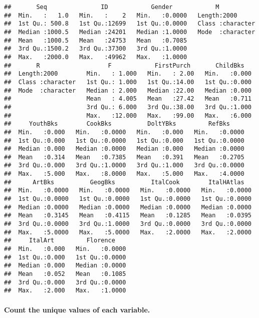 \documentclass[
]{article}
\begin{document}
\begin{verbatim}
##       Seq               ID            Gender            M            
##  Min.   :   1.0   Min.   :    2   Min.   :0.0000   Length:2000       
##  1st Qu.: 500.8   1st Qu.:12699   1st Qu.:0.0000   Class :character  
##  Median :1000.5   Median :24201   Median :1.0000   Mode  :character  
##  Mean   :1000.5   Mean   :24753   Mean   :0.7085                     
##  3rd Qu.:1500.2   3rd Qu.:37300   3rd Qu.:1.0000                     
##  Max.   :2000.0   Max.   :49962   Max.   :1.0000                     
##       R                   F            FirstPurch       ChildBks    
##  Length:2000        Min.   : 1.000   Min.   : 2.00   Min.   :0.000  
##  Class :character   1st Qu.: 1.000   1st Qu.:14.00   1st Qu.:0.000  
##  Mode  :character   Median : 2.000   Median :22.00   Median :0.000  
##                     Mean   : 4.005   Mean   :27.42   Mean   :0.711  
##                     3rd Qu.: 6.000   3rd Qu.:38.00   3rd Qu.:1.000  
##                     Max.   :12.000   Max.   :99.00   Max.   :6.000  
##     YouthBks        CookBks          DoltYBks         RefBks      
##  Min.   :0.000   Min.   :0.0000   Min.   :0.000   Min.   :0.0000  
##  1st Qu.:0.000   1st Qu.:0.0000   1st Qu.:0.000   1st Qu.:0.0000  
##  Median :0.000   Median :0.0000   Median :0.000   Median :0.0000  
##  Mean   :0.314   Mean   :0.7385   Mean   :0.391   Mean   :0.2705  
##  3rd Qu.:0.000   3rd Qu.:1.0000   3rd Qu.:1.000   3rd Qu.:0.0000  
##  Max.   :5.000   Max.   :8.0000   Max.   :5.000   Max.   :4.0000  
##      ArtBks          GeogBks          ItalCook        ItalHAtlas    
##  Min.   :0.0000   Min.   :0.0000   Min.   :0.0000   Min.   :0.0000  
##  1st Qu.:0.0000   1st Qu.:0.0000   1st Qu.:0.0000   1st Qu.:0.0000  
##  Median :0.0000   Median :0.0000   Median :0.0000   Median :0.0000  
##  Mean   :0.3145   Mean   :0.4115   Mean   :0.1285   Mean   :0.0395  
##  3rd Qu.:0.0000   3rd Qu.:1.0000   3rd Qu.:0.0000   3rd Qu.:0.0000  
##  Max.   :5.0000   Max.   :5.0000   Max.   :2.0000   Max.   :2.0000  
##     ItalArt         Florence     
##  Min.   :0.000   Min.   :0.0000  
##  1st Qu.:0.000   1st Qu.:0.0000  
##  Median :0.000   Median :0.0000  
##  Mean   :0.052   Mean   :0.1085  
##  3rd Qu.:0.000   3rd Qu.:0.0000  
##  Max.   :2.000   Max.   :1.0000
\end{verbatim}

\paragraph{Count the unique values of each
variable.}\label{count-the-unique-values-of-each-variable.}
\end{document}
